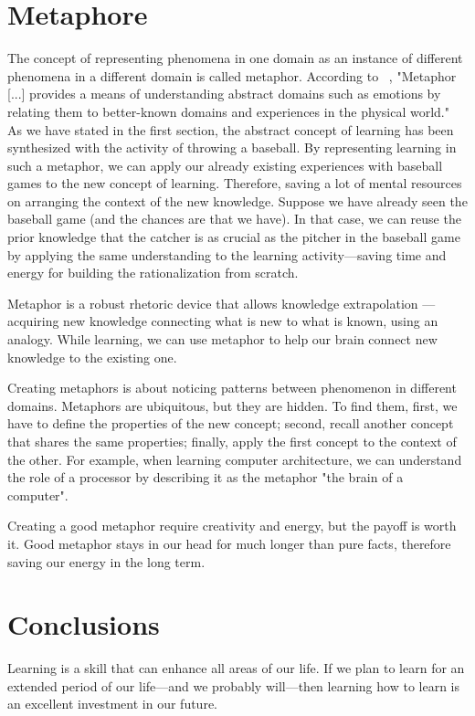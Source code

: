 \documentclass{article}
\begin{document}
\section{Metaphore}
The concept of representing phenomena in one domain as an instance of different phenomena in a different domain is called metaphor. 
According to ~\cite{radden2007cognitive},  "Metaphor [...] provides a means of understanding abstract domains such as emotions by relating them to better-known domains and experiences in the physical world."
As we have stated in the first section, the abstract concept of learning has been synthesized with the activity of throwing a baseball. By representing learning in such a metaphor, we can apply our already existing experiences with baseball games to the new concept of learning. Therefore, saving a lot of mental resources on arranging the context of the new knowledge. Suppose we have already seen the baseball game (and the chances are that we have). In that case, we can reuse the prior knowledge that the catcher is as crucial as the pitcher in the baseball game by applying the same understanding to the learning activity—saving time and energy for building the rationalization from scratch.

Metaphor is a robust rhetoric device that allows knowledge extrapolation — acquiring new knowledge connecting what is new to what is known, using an analogy. While learning, we can use metaphor to help our brain connect new knowledge to the existing one. 

Creating metaphors is about noticing patterns between phenomenon in different domains. Metaphors are ubiquitous, but they are hidden. To find them, first, we have to define the properties of the new concept; second, recall another concept that shares the same properties; finally, apply the first concept to the context of the other. For example, when learning computer architecture, we can understand the role of a processor by describing it as the metaphor "the brain of a computer". 

Creating a good metaphor require creativity and energy, but the payoff is worth it. Good metaphor stays in our head for much longer than pure facts, therefore saving our energy in the long term. 

\section{Conclusions}

Learning is a skill that can enhance all areas of our life. If we plan to learn for an extended period of our life—and we probably will—then learning how to learn is an excellent investment in our future.
\end{document}

